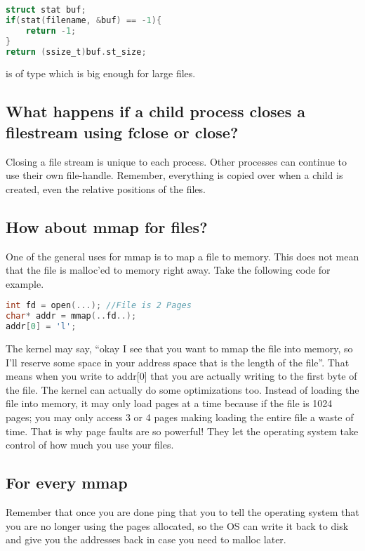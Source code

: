 \begin{lstlisting}[language=C]
struct stat buf;
if(stat(filename, &buf) == -1){
    return -1;
}
return (ssize_t)buf.st_size;
\end{lstlisting}

 is of type  which is big enough for large files.

\subsection{What happens if a child process closes a filestream using fclose or close?}

Closing a file stream is unique to each process. Other processes can continue to use their own file-handle. Remember, everything is copied over when a child is created, even the relative positions of the files.

\subsection{How about mmap for files?}\label{how-about-mmap-for-files}

One of the general uses for mmap is to map a file to memory. This does not mean that the file is malloc'ed to memory right away. Take the following code for example.

\begin{lstlisting}[language=C]
int fd = open(...); //File is 2 Pages
char* addr = mmap(..fd..);
addr[0] = 'l';
\end{lstlisting}

 The kernel may say, ``okay I see that you want to mmap the file into memory, so I'll reserve some space in your address space that is the length of the file''. That means when you write to addr{[}0{]} that you are actually writing to the first byte of the file. The kernel can actually do some optimizations too. Instead of loading the file into memory, it may only load pages at a time because if the file is 1024 pages; you may only access 3 or 4 pages making loading the entire file a waste of time. That is why page faults are so powerful! They let the operating system take control of how much you use your files.

\subsection{For every mmap}

 Remember that once you are done ping that you  to tell the operating system that you are no longer using the pages allocated, so the OS can write it back to disk and give you the addresses back in case you need to malloc later.



